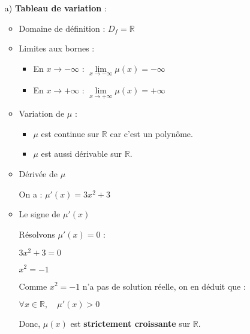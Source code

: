 \documentclass[12pt,a4paper]{article}
\begin{document}
\begin{itemize}
    \item[a)] \textbf{Tableau de variation} :
        \begin{itemize}
            \item Domaine de définition : \( D_f = \mathbb{R} \)
            \item Limites aux bornes :
                  \begin{itemize}
                      \item En \( x \to -\infty \) : \( \lim\limits_{x \to -\infty} \mu(x) = -\infty \)
                      \item En \( x \to +\infty \) : \( \lim\limits_{x \to +\infty} \mu(x) = +\infty \)
                  \end{itemize}
            \item Variation de \( \mu \) :
                  \begin{itemize}
                      \item \( \mu \) est continue sur \( \mathbb{R} \) car c'est un polynôme.
                      \item \( \mu \) est aussi dérivable sur \( \mathbb{R} \).
                  \end{itemize}

            \item  Dérivée de \( \mu \)

                  On a : \( \mu'(x) = 3x^2 + 3 \)

            \item  Le signe de \( \mu'(x) \)

                  Résolvons \( \mu'(x) = 0 \) :

                  \( 3x^2 + 3 = 0 \)

                  \( x^2 = -1 \)

                  Comme \( x^2 = -1 \) n'a pas de solution réelle, on en déduit que :

                  \( \forall x \in \mathbb{R}, \quad \mu'(x) > 0 \)

                  Donc, \( \mu(x) \) est \textbf{strictement croissante} sur \( \mathbb{R} \).


                  \begin{center}
                  \end{center}


\end{itemize}
\end{itemize}
\end{document}
